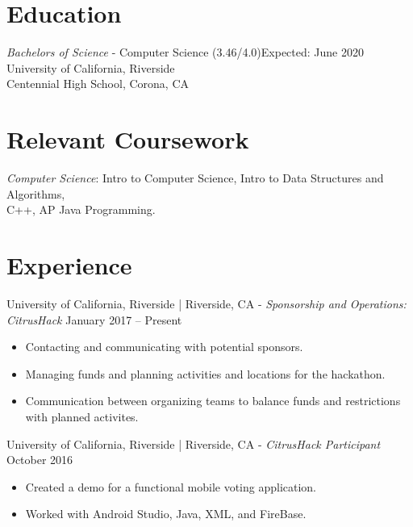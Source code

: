 \documentclass[letter]{res}
\begin{document}
\address{ (951) 318-2818 \\}
\address{
  \texttt{sshar032@ucr.edu}\\ } 
\begin{resume}
  \noindent\makebox[\linewidth]{\rule{\paperwidth}{.05pt}}

\section{Education}
{\sl Bachelors of Science} - Computer Science (3.46/4.0)\hfill Expected: June 2020\\
University of California, Riverside \\
Centennial High School, Corona, CA
  \vspace{-2mm}
\section{Relevant Coursework}
  {\sl Computer Science}: Intro to Computer Science, Intro to Data Structures and Algorithms, \\
  C++, AP Java Programming.\\

\section{Experience}
University of California, Riverside | Riverside, CA \newline
 - {\sl Sponsorship and Operations: CitrusHack} \hfill January 2017 – Present\\
 \vspace{-2mm}
 \begin{itemize}
 \item Contacting and communicating with potential sponsors.
 \item Managing funds and planning activities and locations for the hackathon.
 \item Communication between organizing teams to balance funds and restrictions with planned activites.
 \end{itemize}
   \vspace{-2mm}

University of California, Riverside | Riverside, CA \newline - {\sl CitrusHack Participant} \hfill October 2016\\
  \vspace{-2mm}
  \begin{itemize}
  \item Created a demo for a functional mobile voting application.
  \item Worked with Android Studio, Java, XML, and FireBase.
  \end{itemize}
    \vspace{-2mm}


\end{resume}
\end{document}
